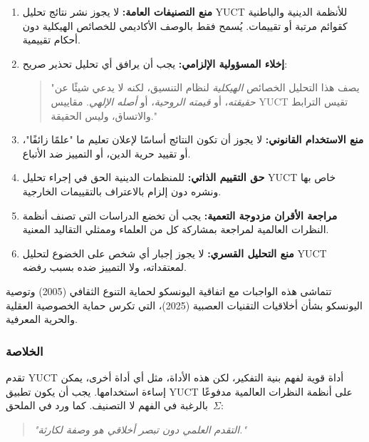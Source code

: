 \documentclass[11pt,a4paper]{article}
\begin{document}
	\begin{enumerate}[label=(\arabic*)]
		\item \textbf{منع التصنيفات العامة:} لا يجوز نشر نتائج تحليل YUCT للأنظمة الدينية والباطنية كقوائم مرتبة أو تقييمات. يُسمح فقط بالوصف الأكاديمي للخصائص الهيكلية دون أحكام تقييمية.
		
		\item \textbf{إخلاء المسؤولية الإلزامي:} يجب أن يرافق أي تحليل تحذير صريح:
		\begin{quote}
			"يصف هذا التحليل الخصائص \emph{الهيكلية} لنظام التنسيق، لكنه لا يدعي شيئًا عن \emph{حقيقته}، أو \emph{قيمته الروحية}، أو \emph{أصله الإلهي}. مقاييس YUCT تقيس الترابط والاتساق، وليس الحقيقة."
		\end{quote}
		
		\item \textbf{منع الاستخدام القانوني:} لا يجوز أن تكون النتائج أساسًا لإعلان تعليم ما "علمًا زائفًا"، أو تقييد حرية الدين، أو التمييز ضد الأتباع.
		
		\item \textbf{حق التقييم الذاتي:} للمنظمات الدينية الحق في إجراء تحليل YUCT خاص بها ونشره دون إلزام بالاعتراف بالتقييمات الخارجية.
		
		\item \textbf{مراجعة الأقران مزدوجة التعمية:} يجب أن تخضع الدراسات التي تصنف أنظمة النظرات العالمية لمراجعة بمشاركة كل من العلماء وممثلي التقاليد المعنية.
		
		\item \textbf{منع التحليل القسري:} لا يجوز إجبار أي شخص على الخضوع لتحليل YUCT لمعتقداته، ولا التمييز ضده بسبب رفضه.
	\end{enumerate}
	
	تتماشى هذه الواجبات مع اتفاقية اليونسكو لحماية التنوع الثقافي (2005) وتوصية اليونسكو بشأن أخلاقيات التقنيات العصبية (2025)، التي تكرس حماية الخصوصية العقلية والحرية المعرفية.
	
	\subsubsection{الخلاصة}
	
	تقدم YUCT أداة قوية لفهم بنية التفكير، لكن هذه الأداة، مثل أي أداة أخرى، يمكن إساءة استخدامها. يجب أن يكون تطبيق YUCT على أنظمة النظرات العالمية مدفوعًا بالرغبة في الفهم لا التصنيف. كما ورد في الملحق~$\Sigma$:
	
	\begin{quote}
		\itshape
		"التقدم العلمي دون تبصر أخلاقي هو وصفة لكارثة."
	\end{quote}
	
\end{document}

